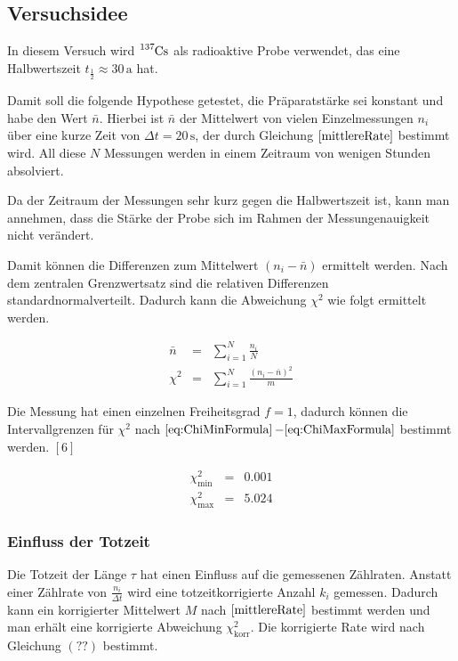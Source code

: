 \documentclass[12pt,a4paper]{scrartcl}
\numberwithin{equation}{section} %
\renewcommand{\[}{} %
\renewcommand{\]}{\noindent} %
\begin{document}
\hypertarget{versuchsidee}{%
\subsection{Versuchsidee}\label{versuchsidee}}

In diesem Versuch wird \(\ce{^{137}Cs}\) als radioaktive Probe
verwendet, das eine Halbwertszeit \(t_\frac{1}{2}\approx 30\,\mathrm a\)
hat.

Damit soll die folgende Hypothese getestet, die Präparatstärke sei
konstant und habe den Wert \(\bar n\). Hierbei ist \(\bar n\) der
Mittelwert von vielen Einzelmessungen \(n_i\) über eine kurze Zeit von
\(\Delta t=20\,\mathrm s\), der durch Gleichung \(\eqref{mittlereRate}\)
bestimmt wird. All diese \(N\) Messungen werden in einem Zeitraum von
wenigen Stunden absolviert.

Da der Zeitraum der Messungen sehr kurz gegen die Halbwertszeit ist,
kann man annehmen, dass die Stärke der Probe sich im Rahmen der
Messungenauigkeit nicht verändert.

Damit können die Differenzen zum Mittelwert \((n_i-\bar n)\) ermittelt
werden. Nach dem zentralen Grenzwertsatz sind die relativen Differenzen
standardnormalverteilt. Dadurch kann die Abweichung \(\chi^2\) wie folgt
ermittelt werden.

\[
\begin{eqnarray}
    \bar n &=& \sum_{i=1}^N \frac{n_i}{N} \label{mittlereRate} \\
    \chi^2 &=& \sum_{i=1}^N \frac{(n_i-\bar n)^2}{m} \label{ChiSquared}
\end{eqnarray}
\]

Die Messung hat einen einzelnen Freiheitsgrad \(f=1\), dadurch können
die Intervallgrenzen für \(\chi^2\) nach
\(\eqref{eq:ChiMinFormula}\)\(-\eqref{eq:ChiMaxFormula}\) bestimmt
werden. \([6]\)

\[
\begin{eqnarray}
    \chi^2_\mathrm{min} &=& 0.001 \label{ChiMin} \\
    \chi^2_\mathrm{max} &=& 5.024 \label{ChiMax}
\end{eqnarray}
\]

\hypertarget{einfluss-der-totzeit}{%
\subsubsection{Einfluss der Totzeit}\label{einfluss-der-totzeit}}

Die Totzeit der Länge \(\tau\) hat einen Einfluss auf die gemessenen
Zählraten. Anstatt einer Zählrate von \(\frac{n_i}{\Delta t}\) wird eine
totzeitkorrigierte Anzahl \(k_i\) gemessen. Dadurch kann ein
korrigierter Mittelwert \(M\) nach \(\eqref{mittlereRate}\) bestimmt
werden und man erhält eine korrigierte Abweichung
\(\chi^2_\mathrm{korr}\). Die korrigierte Rate wird nach Gleichung
\((??)\) bestimmt.
\end{document}
